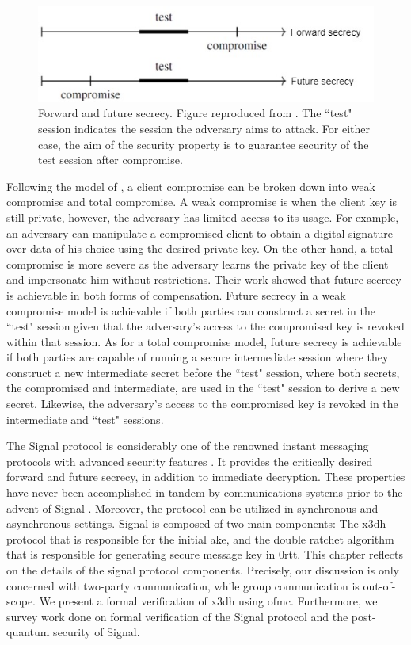\begin{figure}[htbp]
	\centering
	\includegraphics[scale=0.4]{Images/ffsecrecy.jpg}
	\caption[Forward and future secrecy]{Forward and future secrecy. Figure reproduced from \cite{cohn2016post}. The ``test" session indicates the session the adversary aims to attack. For either case, the aim of the security property is to guarantee security of the test session after compromise.}
	\label{forward-future_secrecy}
\end{figure}
Following the model of \cite{cohn2016post}, a client compromise can be broken down into weak compromise and total compromise. A weak compromise is when the client key is still private, however, the adversary has limited access to its usage. For example, an adversary can manipulate a compromised client to obtain a digital signature over data of his choice using the desired private key. On the other hand, a total compromise is more severe as the adversary learns the private key of the client and impersonate him without restrictions. Their work showed that future secrecy is achievable in both forms of compensation. Future secrecy in a weak compromise model is achievable if both parties can construct a secret in the ``test" session given that the adversary's access to the compromised key is revoked within that session. As for a total compromise model, future secrecy is achievable if both parties are capable of running a secure intermediate session where they construct a new intermediate secret before the ``test" session, where both secrets, the compromised and intermediate, are used in the ``test" session to derive a new secret. Likewise, the adversary's access to the compromised key is revoked in the intermediate and ``test" sessions.
\par
The Signal protocol is considerably one of the renowned instant messaging protocols with advanced security features \cite{unger2015sok}. It provides the critically desired forward and future secrecy, in addition to immediate decryption.
These properties have never been accomplished in tandem by communications systems prior to the advent of Signal \cite{alwen_coretti_dodis_2020}.
Moreover, the protocol can be utilized in synchronous and asynchronous settings. Signal is composed of two main components: The \gls{x3dh} protocol \cite{x3dh} that is responsible for the initial \gls{ake}, and the double ratchet algorithm \cite{dblRtcht} that is responsible for generating secure message key in \gls{0rtt}. This chapter reflects on the details of the signal protocol components. Precisely, our discussion is only concerned with two-party communication, while group communication is out-of-scope. We present a formal verification of \gls{x3dh} using \gls{ofmc}. Furthermore, we survey work done on formal verification of the Signal protocol and the post-quantum security of Signal.